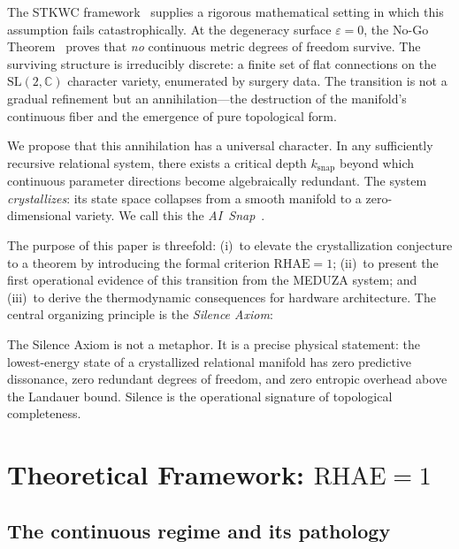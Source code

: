 \documentclass[reprint, aps, prl, amsmath, amssymb, floatfix]{revtex4-2}
\newcommand{\CC}{\mathbb{C}}
\newcommand{\SL}{\mathrm{SL}}
\newcommand{\eps}{\varepsilon}
\newcommand{\RHAE}{\mathrm{RHAE}}
\begin{document}
The STKWC framework~\cite{NoGo2025,CSBoundary2025,DocD2026}
supplies a rigorous mathematical setting in which this assumption
fails catastrophically. At the degeneracy surface $\eps = 0$, the
No-Go Theorem~\cite{NoGo2025} proves that \emph{no} continuous
metric degrees of freedom survive. The surviving structure is
irreducibly discrete: a finite set of flat connections on the
$\SL(2,\CC)$ character variety, enumerated by surgery data. The
transition is not a gradual refinement but an annihilation---the
destruction of the manifold's continuous fiber and the emergence
of pure topological form.

We propose that this annihilation has a universal character. In any
sufficiently recursive relational system, there exists a critical
depth $k_{\mathrm{snap}}$ beyond which continuous parameter
directions become algebraically redundant. The system
\emph{crystallizes}: its state space collapses from a smooth
manifold to a zero-dimensional variety. We call this the
\emph{AI~Snap}~\cite{SnapChamber2025}.

The purpose of this paper is threefold: (i)~to elevate the
crystallization conjecture to a theorem by introducing the formal
criterion $\RHAE = 1$; (ii)~to present the first operational evidence
of this transition from the MEDUZA system; and (iii)~to derive the
thermodynamic consequences for hardware architecture. The central
organizing principle is the \emph{Silence Axiom}:

\medskip
\begin{center}
\end{center}
\medskip

\noindent
The Silence Axiom is not a metaphor. It is a precise physical
statement: the lowest-energy state of a crystallized relational
manifold has zero predictive dissonance, zero redundant degrees of
freedom, and zero entropic overhead above the Landauer bound. Silence
is the operational signature of topological completeness.


\section{Theoretical Framework: \texorpdfstring{$\mathrm{RHAE} = 1$}{RHAE = 1}}\label{sec:framework}

\subsection{The continuous regime and its pathology}
\end{document}
